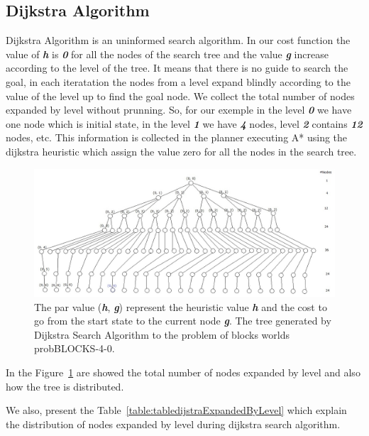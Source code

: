 \documentclass[11pt,a4paper,oneside]{report}
\begin{document}
\subsection{Dijkstra Algorithm}
Dijkstra Algorithm is an uninformed search algorithm. In our cost function the value of \textbf{\textit{h}} is \textbf{\textit{0}} for all the nodes of the search tree and the value \textbf{\textit{g}} increase according to the level of the tree. It means that there is no guide to search the goal, in each iteratation the nodes from a level expand blindly according to the value of the level  up to find the goal node. We collect the total number of nodes expanded by level without prunning. So, for our exemple in the level \textbf{\textit{0}} we have one node which is initial state, in the level \textbf{\textit{1}} we have \textbf{\textit{4}} nodes, level \textbf{\textit{2}} contains \textbf{\textit{12}} nodes, etc. This information is collected in the planner executing A* using the dijkstra heuristic which assign the value zero for all the nodes in the search tree. 

\begin{figure}[htb]
\begin{center}
\includegraphics[width=12cm]{./image/dijkstra}
\caption{The par value (\textbf{\textit{h}}, \textbf{\textit{g}}) represent the heuristic value \textbf{\textit{h}} and the cost to go from the start state to the current node \textbf{\textit{g}}. The tree generated by Dijkstra Search Algorithm to the problem of blocks worlds probBLOCKS-4-0.}
\label{fig:dijkstraTreeInconsistent}
\end{center}
\end{figure}

In the Figure~\ref{fig:dijkstraTreeInconsistent} are showed the total number of nodes expanded by level and also how the tree is distributed.\newline

We also, present the Table~\ref{table:tabledijstraExpandedByLevel} which explain the distribution of nodes expanded by level during dijkstra search algorithm.\newline
\end{document}
